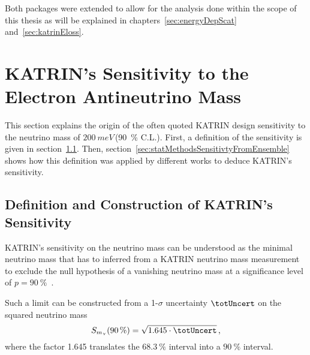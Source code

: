 Both packages were extended to allow for the analysis done within the scope of this thesis as will be explained in chapters~\ref{sec:energyDepScat} and~\ref{sec:katrinEloss}.




\section{KATRIN's Sensitivity to the Electron Antineutrino Mass}
\label{sec:statMethodsKatrinSensitivity}
This section explains the origin of the often quoted KATRIN design sensitivity to the neutrino mass of $\SI{200}{meV}$\,(\SI{90}{\percent} C.L.). First, a definition of the sensitivity is given in section~\ref{sec:statMethodsSensitivtyDef}. Then, section~\ref{sec:statMethodsSensitivtyFromEnsemble} shows how this definition was applied by different works to deduce KATRIN's sensitivity.

\subsection{Definition and Construction of KATRIN's Sensitivity}
\label{sec:statMethodsSensitivtyDef}
KATRIN's sensitivity on the neutrino mass can be understood as the minimal neutrino mass that has to inferred from a KATRIN neutrino mass measurement to exclude the null hypothesis of a vanishing neutrino mass at a significance level of $p=\SI{90}{\percent}$~\cite{Kleesiek2014,Angrik:2005ep}.

Such a limit can be constructed from a 1-$\sigma$ uncertainty $\totUncert$ on the squared neutrino mass~\cite{Kleesiek2014,Angrik:2005ep}
\begin{equation}
	\label{eq:statMethodsSensitivity}
	S_{\nuMass}(\SI{90}{\percent}) = \sqrt{1.645\cdot\totUncert}
	\comma
\end{equation}
where the factor 1.645 translates the $\SI{68.3}{\percent}$ interval into a $\SI{90}{\percent}$ interval.

